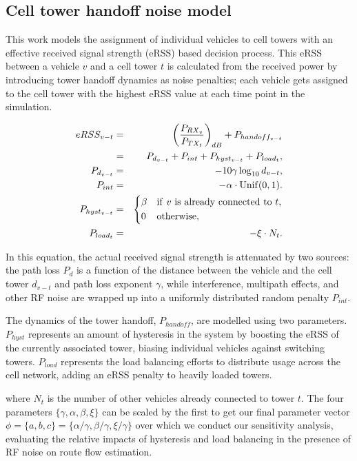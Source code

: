 \subsection{Cell tower handoff noise model}

This work models the assignment of individual vehicles to cell towers with an effective received signal strength (eRSS) based decision process.  This eRSS between a vehicle $v$ and a cell tower $t$ is calculated from the received power by introducing tower handoff dynamics as noise penalties;
each vehicle gets assigned to the cell tower with the highest eRSS value at each time point in the simulation.

\begin{eqnarray}
  eRSS_{v-t} & = & \left( \frac{P_{RX_v}}{P_{TX_t}} \right)_{dB} 
                   + P_{handoff_{v-t}} \\
  & = & P_{d_{v-t}} +P_{int} + P_{hyst_{v-t}} + P_{load_t}, \\
  P_{d_{v-t}} & = & -10 \gamma \log_{10} d_{v-t}, \\
  P_{int} & = & -\alpha \cdot \mathrm{Unif}(0,1). \\
  P_{hyst_{v-t}} & = & \begin{dcases}
    \beta & \mathrm{if~} v \mathrm{~is~already~connected~to~} t, \\
    0 & \mathrm{otherwise,}
  \end{dcases} \\
  P_{load_t} & = & -\xi \cdot N_{t}.
\end{eqnarray}

In this equation, the actual received signal strength is attenuated by two sources: the path loss $P_d$ 
is a function of the distance between the vehicle and the cell tower $d_{v-t}$ and path loss exponent $\gamma$, while 
interference, multipath effects, and other RF noise are wrapped up into a uniformly distributed random penalty $P_{int}$.

The dynamics of the tower handoff, $P_{handoff}$, are modelled using two parameters.  $P_{hyst}$ represents an amount of hysteresis in the system by boosting the eRSS of the currently associated tower, biasing individual vehicles against switching towers.
$P_{load}$ represents the load balancing efforts to distribute usage across the cell network, adding an eRSS penalty to heavily loaded towers.

where $N_t$ is the number of other vehicles already connected to tower $t$.  The four parameters $\{\gamma, \alpha, \beta, \xi\}$ can be scaled by the first to get our final parameter vector $\phi = \{a, b, c\} = \{\alpha/\gamma, \beta/\gamma, \xi/\gamma\}$ over which we conduct our sensitivity analysis, evaluating the relative impacts of hysteresis and load balancing in the presence of RF noise on route flow estimation.

